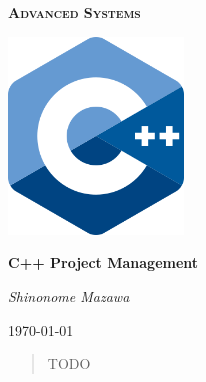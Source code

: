 \documentclass[a4paper]{article}
\begin{document}
\begin{titlepage}
    \centering
    {\scshape\Huge \bfseries{Advanced Systems} \par}
    \par\vspace{1cm}
    \includegraphics[width=0.35\textwidth]{images/cpp-logo.png}\par
    \vspace{3cm}
    {\huge\bfseries C++ Project Management \par}
    \vspace{1cm}
    {\LARGE\itshape Shinonome Mazawa \par}
    \vspace{1cm}
    {\large\today\par}
    \vfill
    \begin{abstract}
        TODO
    \end{abstract}
\end{titlepage}

\newpage

\tableofcontents
{}

\newpage




% 



% 

% 





% 



% 


\newpage

\medskip
\printbibliography
\end{document}
